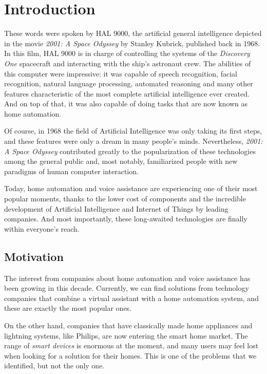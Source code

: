 \chapter{Introduction}


These words were spoken by HAL 9000, the artificial general intelligence depicted in the movie \textit{2001: A Space Odyssey}
by Stanley Kubrick, published back in 1968. In this film, HAL 9000 is in charge of controlling the systems of the
\textit{Discovery One} spacecraft and interacting with the ship's astronaut crew. The abilities of this computer were impressive: it
was capable of speech recognition, facial recognition, natural language processing, automated reasoning and many other features
characteristic of the most complete artificial intelligence ever created. And on top of that, it was also capable of doing tasks
that are now known as home automation.

Of course, in 1968 the field of Artificial Intelligence was only taking its first steps, and these features were only a dream in many
people's minds.\cite{harvardHistory} Nevertheless, \textit{2001: A Space Odyssey} contributed greatly to the popularization of 
these technologies among the general public and, most notably, familiarized people with new paradigms of human computer interaction.

Today, home automation and voice assistance are experiencing one of their most popular moments, thanks to the lower cost of components
and the incredible development of Artificial Intelligence and Internet of Things by leading companies. And most importantly, these
long-awaited technologies are finally within everyone's reach.

\section{Motivation}
The interest from companies about home automation and voice assistance has been growing in this decade. Currently, we can find
solutions from technology companies that combine a virtual assistant with a home automation system, and these are exactly the most
popular ones.\cite{techRadarBest}

On the other hand, companies that have classically made home appliances and lightning systems, like Philips, are now entering the smart 
home market.\cite{philipsHueMeethue} The range of \textit{smart devices} is enormous at the moment, and many users may feel lost when
looking for a solution for their homes. This is one of the problems that we identified, but not the only one.


